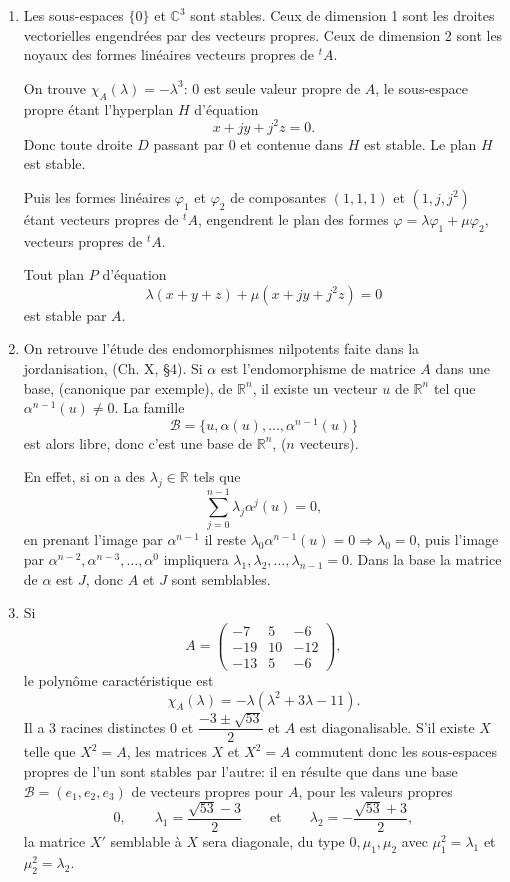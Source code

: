 \begin{enumerate}[label=\arabic*.,leftmargin=2.2em,itemsep=1.1em]
\item Les sous-espaces $\{0\}$ et $\mathbb C^3$ sont stables. Ceux de dimension 1 sont les droites vectorielles engendrées par des vecteurs propres. Ceux de dimension 2 sont les noyaux des formes linéaires vecteurs propres de ${}^tA$.

On trouve $\chi_A(\lambda)=-\lambda^3$: 0 est seule valeur propre de $A$, le sous-espace propre étant l'hyperplan $H$ d'équation
\[
x+jy+j^2z=0.
\]
Donc toute droite $D$ passant par 0 et contenue dans $H$ est stable. Le plan $H$ est stable.

Puis les formes linéaires $\varphi_1$ et $\varphi_2$ de composantes $(1,1,1)$ et $(1,j,j^2)$ étant vecteurs propres de ${}^tA$, engendrent le plan des formes $\varphi=\lambda\varphi_1+\mu\varphi_2$, vecteurs propres de ${}^tA$.

Tout plan $P$ d'équation
\[
\lambda(x+y+z)+\mu(x+jy+j^2z)=0
\]
est stable par $A$.

\item On retrouve l'étude des endomorphismes nilpotents faite dans la jordanisation, (Ch. X, §4). Si $\alpha$ est l'endomorphisme de matrice $A$ dans une base, (canonique par exemple), de $\mathbb R^n$, il existe un vecteur $u$ de $\mathbb R^n$ tel que $\alpha^{n-1}(u)\ne0$.
La famille
\[
\mathcal B=\{u,\alpha(u),\ldots,\alpha^{n-1}(u)\}
\]
est alors libre, donc c'est une base de $\mathbb R^n$, ($n$ vecteurs).

En effet, si on a des $\lambda_j\in\mathbb R$ tels que
\[
\sum_{j=0}^{n-1}\lambda_j\alpha^j(u)=0,
\]
en prenant l'image par $\alpha^{n-1}$ il reste $\lambda_0\alpha^{n-1}(u)=0\Rightarrow\lambda_0=0$, puis l'image par $\alpha^{n-2},\alpha^{n-3},\ldots,\alpha^0$ impliquera $\lambda_1,\lambda_2,\ldots,\lambda_{n-1}=0$. Dans la base  la matrice de $\alpha$ est $J$, donc $A$ et $J$ sont semblables.

\item Si
\[
A=\begin{pmatrix}-7&5&-6\\-19&10&-12\\-13&5&-6\end{pmatrix},
\]
le polynôme caractéristique est
\[
\chi_A(\lambda)=-\lambda(\lambda^2+3\lambda-11).
\]
Il a 3 racines distinctes $0$ et $\dfrac{-3\pm\sqrt{53}}2$ et $A$ est diagonalisable. S'il existe $X$ telle que $X^2=A$, les matrices $X$ et $X^2=A$ commutent donc les sous-espaces propres de l'un sont stables par l'autre: il en résulte que dans une base $\mathcal B=(e_1,e_2,e_3)$ de vecteurs propres pour $A$, pour les valeurs propres
\[
0,\qquad \lambda_1=\frac{\sqrt{53}-3}{2}\qquad\text{et}\qquad
\lambda_2=-\frac{\sqrt{53}+3}{2},
\]
la matrice $X'$ semblable à $X$ sera diagonale, du type $0,\mu_1,\mu_2$ avec $\mu_1^2=\lambda_1$ et $\mu_2^2=\lambda_2$.


\end{enumerate}
